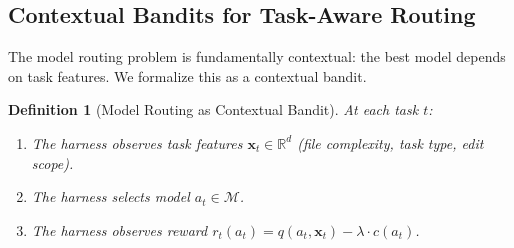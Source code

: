 \documentclass[11pt, a4paper, logo, copyright]{googledeepmind}
\newtheorem{definition}{Definition}[section]
\begin{document}
\subsection{Contextual Bandits for Task-Aware Routing}

The model routing problem is fundamentally contextual: the best model depends on task features. We formalize this as a contextual bandit.

\begin{definition}[Model Routing as Contextual Bandit]
At each task $t$:
\begin{enumerate}
\item The harness observes task features $\mathbf{x}_t \in \mathbb{R}^d$ (file complexity, task type, edit scope).
\item The harness selects model $a_t \in \mathcal{M}$.
\item The harness observes reward $r_t(a_t) = q(a_t, \mathbf{x}_t) - \lambda \cdot c(a_t)$.
\end{enumerate}
\end{definition}
\end{document}
